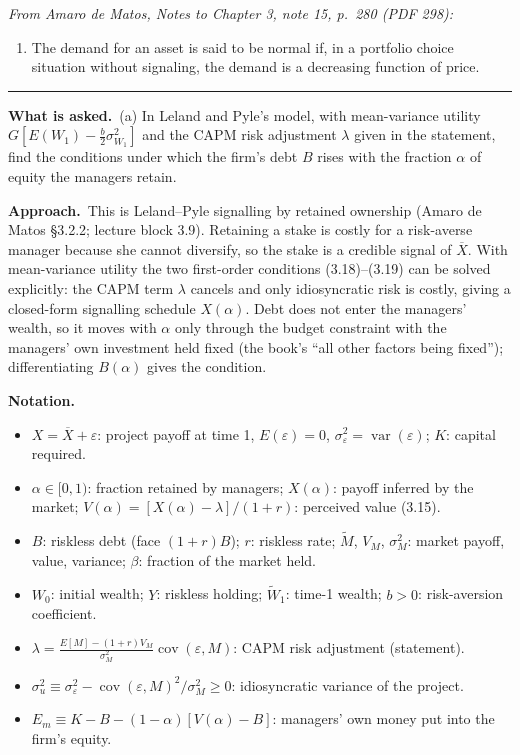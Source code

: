 \documentclass[11pt,a4paper]{article}
\newcommand{\notation}{\par\noindent\textbf{Notation.}}
\newcommand{\asked}{\par\medskip\noindent\textbf{What is asked.}~}
\newcommand{\approach}{\par\smallskip\noindent\textbf{Approach.}~}
\providecommand{\tightlist}{\setlength{\itemsep}{0pt}\setlength{\parskip}{0pt}}
\newcommand{\stmtend}{\par\endgroup\nopagebreak\noindent\rule{\linewidth}{0.4pt}\par\medskip}
\begin{document}
\emph{From Amaro de Matos, Notes to Chapter 3, note 15, p.~280 (PDF 298):}

\begin{enumerate}
\def\labelenumi{\arabic{enumi}.}
\setcounter{enumi}{14}
\tightlist
\item
  The demand for an asset is said to be normal if, in a portfolio choice situation without
  signaling, the demand is a decreasing function of price.
\end{enumerate}
\stmtend

\asked (a) In Leland and Pyle's model, with mean-variance utility $G[E(W_1)-\frac b2\sigma^2_{W_1}]$ and the CAPM risk adjustment $\lambda$ given in the statement, find the conditions under which the firm's debt $B$ rises with the fraction $\alpha$ of equity the managers retain.

\approach This is Leland--Pyle signalling by retained ownership (Amaro de Matos \S3.2.2; lecture block 3.9). Retaining a stake is costly for a risk-averse manager because she cannot diversify, so the stake is a credible signal of $\overline X$. With mean-variance utility the two first-order conditions (3.18)--(3.19) can be solved explicitly: the CAPM term $\lambda$ cancels and only idiosyncratic risk is costly, giving a closed-form signalling schedule $X(\alpha)$. Debt does not enter the managers' wealth, so it moves with $\alpha$ only through the budget constraint with the managers' own investment held fixed (the book's ``all other factors being fixed''); differentiating $B(\alpha)$ gives the condition.

\notation
\begin{itemize}
  \item $X=\overline X+\varepsilon$: project payoff at time 1, $E(\varepsilon)=0$, $\sigma_\varepsilon^2=\operatorname{var}(\varepsilon)$; $K$: capital required.
  \item $\alpha\in[0,1)$: fraction retained by managers; $X(\alpha)$: payoff inferred by the market; $V(\alpha)=[X(\alpha)-\lambda]/(1+r)$: perceived value (3.15).
  \item $B$: riskless debt (face $(1+r)B$); $r$: riskless rate; $\widetilde M$, $V_M$, $\sigma_M^2$: market payoff, value, variance; $\beta$: fraction of the market held.
  \item $W_0$: initial wealth; $Y$: riskless holding; $\widetilde W_1$: time-1 wealth; $b>0$: risk-aversion coefficient.
  \item $\lambda=\frac{E[M]-(1+r)V_M}{\sigma_M^2}\operatorname{cov}(\varepsilon,M)$: CAPM risk adjustment (statement).
  \item $\sigma_u^2\equiv\sigma_\varepsilon^2-\operatorname{cov}(\varepsilon,M)^2/\sigma_M^2\ge0$: idiosyncratic variance of the project.
  \item $E_m\equiv K-B-(1-\alpha)[V(\alpha)-B]$: managers' own money put into the firm's equity.
\end{itemize}
\end{document}
